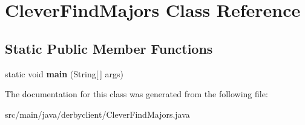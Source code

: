 \hypertarget{classCleverFindMajors}{}\section{Clever\+Find\+Majors Class Reference}
\label{classCleverFindMajors}
\subsection*{Static Public Member Functions}
\begin{DoxyCompactItemize}
\item 
\mbox{\label{classCleverFindMajors_ad9791d5a626faf37f4eb52246aca549f}} 
static void {\bfseries main} (String\mbox{[}$\,$\mbox{]} args)
\end{DoxyCompactItemize}


The documentation for this class was generated from the following file\+:\begin{DoxyCompactItemize}
\item 
src/main/java/derbyclient/Clever\+Find\+Majors.\+java\end{DoxyCompactItemize}
